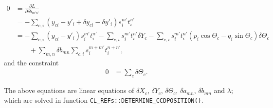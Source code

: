 \documentclass{scrartcl}
\begin{document}
\begin{align}
    0
    &=\frac{\partial L}{\partial \delta b_{m'n'}}
\\  &= - \sum_{c,i} \left( y_{ci} - y'_i + \delta y_{ci} - \delta y'_i \right) s_i^{m'} t_i^{n'}
\\  &= - \sum_{c,i} (y_{ci} - y'_i) s_i^{m'} t_i^{n'}
        - \sum_{c,i} s_i^{m'} t_i^{n'} \delta Y_{c}
        - \sum_{c,i} s_i^{m'} t_i^{n'} \left(p_i \cos \Theta_c - q_i \sin \Theta_c \right) \delta \Theta_c
            \nonumber \\ & \qquad
        + \sum_{m,n} \delta b_{mn} \sum_{c,i} s_i^{m+m'} t_i^{n+n'}
,
\end{align}
and the constraint
\begin{align}
    0 &= \sum_{c} \delta \Theta_c
.
\end{align}

The above equations are linear equations of
$\delta X_c$, $\delta Y_c$, $\delta \Theta_c$, $\delta a_{mn}$, $\delta b_{mn}$ and $\lambda$;
which are solved in function \texttt{CL\_REFs::DETERMINE\_CCDPOSITION()}.
\end{document}

